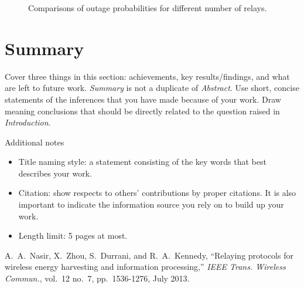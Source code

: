 \documentclass[11pt,a4paper]{scrartcl}
\begin{document}
\begin{figure}[!t]
\centering%
\hfil {}
\caption{Comparisons of outage probabilities for different number of
relays.} \label{fig:pout}
\end{figure}

\section{Summary}\label{sec:summary}
Cover three things in this section: achievements, key results/findings, and what are left to future work. \emph{Summary} is not a duplicate of \emph{Abstract}. Use short, concise statements of the inferences that you have made because of your work. Draw meaning conclusions that should be directly related to the question raised in \emph{Introduction}.

\bigskip\bigskip
\noindent Additional notes
\begin{itemize}[noitemsep]
\item Title naming style: a statement consisting of the key words that best
describes your work.
\item Citation: show respects to others' contributions by proper citations. It is also important to indicate the information source you rely on to build up your work. 
\item Length limit: 5 pages at most.
\end{itemize}



\begin{thebibliography}{99}

A.~A.~Nasir, X.~Zhou, S.~Durrani, and R.~A.~Kennedy, ``Relaying
protocols for wireless energy harvesting and information
processing,'' \emph{IEEE Trans. Wireless Commun.}, vol.~12 no.~7,
pp.~1536-1276, July 2013.

\end{thebibliography}

\end{document}
